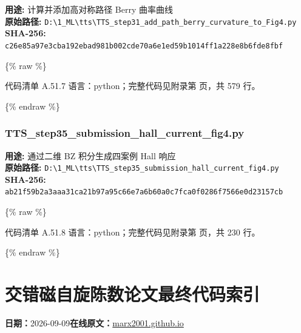 \documentclass[lang=cn,scheme=chinese,color=blue,device=normal,toc=onecol,math=cm]{elegantbook}
\begin{document}
\textbf{用途:} 计算并添加高对称路径 Berry 曲率曲线\\ \textbf{原始路径:} \texttt{D:\textbackslash{}\allowbreak{}1\_\allowbreak{}ML\textbackslash{}\allowbreak{}tts\textbackslash{}\allowbreak{}TTS\_\allowbreak{}step31\_\allowbreak{}add\_\allowbreak{}path\_\allowbreak{}berry\_\allowbreak{}curvature\_\allowbreak{}to\_\allowbreak{}Fig4.py}\\ \textbf{SHA-256:} \texttt{c26e85a97e3cba192ebad981b002cde70a6e1ed59b1014ff1a228e8b6fde8fbf}\par


\{\% raw \%\}\par


\begin{codeindexbox}{代码清单 A.51.7}
语言：python；完整代码见附录第 \pageref{code:51:7} 页，共 579 行。
\end{codeindexbox}


\{\% endraw \%\}\par


\subsubsection{TTS\_\allowbreak{}step35\_\allowbreak{}submission\_\allowbreak{}hall\_\allowbreak{}current\_\allowbreak{}fig4.py}


\textbf{用途:} 通过二维 BZ 积分生成四案例 Hall 响应\\ \textbf{原始路径:} \texttt{D:\textbackslash{}\allowbreak{}1\_\allowbreak{}ML\textbackslash{}\allowbreak{}tts\textbackslash{}\allowbreak{}TTS\_\allowbreak{}step35\_\allowbreak{}submission\_\allowbreak{}hall\_\allowbreak{}current\_\allowbreak{}fig4.py}\\ \textbf{SHA-256:} \texttt{ab21f59b2a3aaa31ca21b97a95c66e7a6b60a0c7fca0f0286f7566e0d23157cb}\par


\{\% raw \%\}\par


\begin{codeindexbox}{代码清单 A.51.8}
语言：python；完整代码见附录第 \pageref{code:51:8} 页，共 230 行。
\end{codeindexbox}


\{\% endraw \%\}\par



\section{交错磁自旋陈数论文最终代码索引}
\begin{articlemeta}
\textbf{日期：}2026-09-09\hfill\textbf{在线原文：}\href{https://marx2001.github.io/sci-note\_posts/20260909-altermagnetic-paper-code-index/}{marx2001.github.io}
\end{articlemeta}
\end{document}
